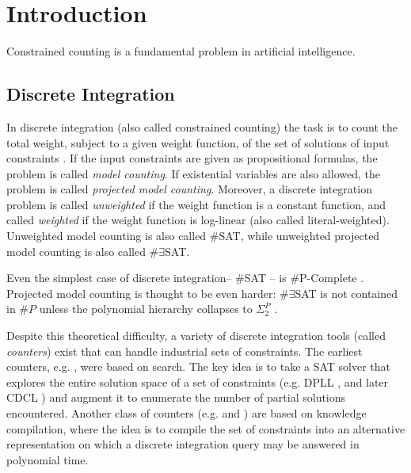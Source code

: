 \chapter{Introduction}
\label{ch:intro}
Constrained counting is a fundamental problem in artificial intelligence.

\section{Discrete Integration}
In discrete integration (also called constrained counting) the task is to count the total weight, subject to a given weight function, of the set of solutions of input constraints \cite{GSS08}. 
If the input constraints are given as propositional formulas, the problem is called \emph{model counting}. 
If existential variables are also allowed, the problem is called \emph{projected model counting}. 
Moreover, a discrete integration problem is called \emph{unweighted} if the weight function is a constant function, and called \emph{weighted} if the weight function is log-linear (also called literal-weighted). Unweighted model counting is also called \#SAT, while unweighted projected model counting is also called $\#\exists$SAT.

Even the simplest case of discrete integration-- \#SAT -- is \#P-Complete \cite{Valiant79}. Projected model counting is thought to be even harder: $\#\exists$SAT is not contained in $\#P$ unless the polynomial hierarchy collapses to $\Sigma_2^P$ \cite{zawadzki2013generalization}.

Despite this theoretical difficulty, a variety of discrete integration tools (called \emph{counters}) exist that can handle industrial sets of constraints. The earliest counters, e.g.  \cite{birnbaum1999good}, were based on search. The key idea is to take a SAT solver that explores the entire solution space of a set of constraints (e.g. DPLL \cite{davis1960computing,davis1962machine}, and later CDCL \cite{biere2009conflict}) and augment it to enumerate the number of partial solutions encountered. Another class of counters (e.g.  \cite{OD15} and  \cite{LM17}) are based on knowledge compilation, where the idea is to compile the set of constraints into an alternative representation on which a discrete integration query may be answered in polynomial time.



